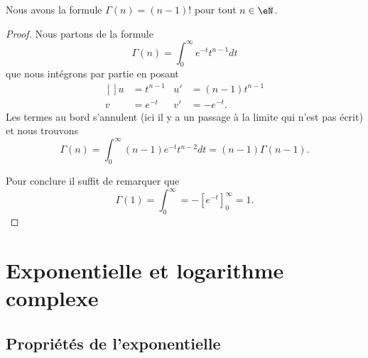\begin{proposition}
	Nous avons la formule \( \Gamma(n)=(n-1)!\) pour tout \( n\in \eN\).
\end{proposition}

\begin{proof}
	Nous partons de la formule
	\begin{equation}
		\Gamma(n)=\int_0^{\infty} e^{-t}t^{n-1}dt
	\end{equation}
	que nous intégrons par partie en posant
	\begin{equation}
		\begin{aligned}[]
			u & =t^{n-1} & u' & =(n-1)t^{n-1} \\
			v & = e^{-t} & v' & =- e^{-t}.
		\end{aligned}
	\end{equation}
	Les termes au bord s'annulent (ici il y a un passage à la limite qui n'est pas écrit) et nous trouvons
	\begin{equation}
		\Gamma(n)=\int_0^{\infty}(n-1) e^{-t}t^{n-2}dt=(n-1)\Gamma(n-1).
	\end{equation}

	Pour conclure il suffit de remarquer que
	\begin{equation}
		\Gamma(1)=\int_0^{\infty}=-[ e^{-t}]_0^{\infty}=1.
	\end{equation}
\end{proof}

\section{Exponentielle et logarithme complexe}

\subsection{Propriétés de l'exponentielle}

